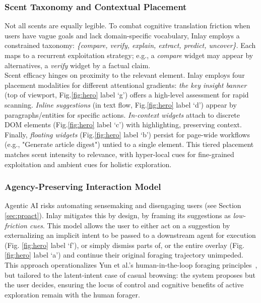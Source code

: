 \documentclass[sigconf]{acmart}
\begin{document}
\subsubsection{Scent Taxonomy and Contextual Placement}
\label{sec:scent_granularity}
Not all scents are equally legible. To combat cognitive translation friction when users have vague goals and lack domain-specific vocabulary, Inlay employs a constrained taxonomy: \emph{\{compare, verify, explain, extract, predict, uncover\}}. Each maps to a recurrent exploitation strategy; e.g., a \emph{compare} widget may appear by alternatives, a \emph{verify} widget by a factual claim. \\
Scent efficacy hinges on proximity to the relevant element. Inlay employs four placement modalities for different attentional gradients: \emph{the key insight banner} (top of viewport, Fig.\ref{fig:hero} label `g') offers a high-level assessment for rapid scanning. \emph{Inline suggestions} (in text flow, Fig.\ref{fig:hero} label `d') appear by paragraphs/entities for specific actions. \emph{In-context widgets} attach to discrete DOM elements (Fig.\ref{fig:hero} label `c') with highlighting, preserving context. Finally, \emph{floating widgets} (Fig.\ref{fig:hero} label `b') persist for page-wide workflows (e.g., "Generate article digest") untied to a single element. This tiered placement matches scent intensity to relevance, with hyper-local cues for fine-grained exploitation and ambient cues for holistic exploration.

\subsubsection{Agency-Preserving Interaction Model}
\label{sec:agency}
Agentic AI risks automating sensemaking and disengaging users (see Section \ref{sec:proact}). Inlay mitigates this by design, by framing its suggestions as \emph{low-friction cues}. This model allows the user to either act on a suggestion by externalizing an implicit intent to be passed to a downstream agent for execution (Fig. \ref{fig:hero} label `f'), or simply dismiss parts of, or the entire overlay (Fig. \ref{fig:hero} label `a') and continue their original foraging trajectory unimpeded. This approach operationalizes Yun et al.'s human-in-the-loop foraging principles~\cite{hitl}, but tailored to the latent-intent case of casual browsing: the system proposes but the user decides, ensuring the locus of control and cognitive benefits of active exploration remain with the human forager.
\end{document}
